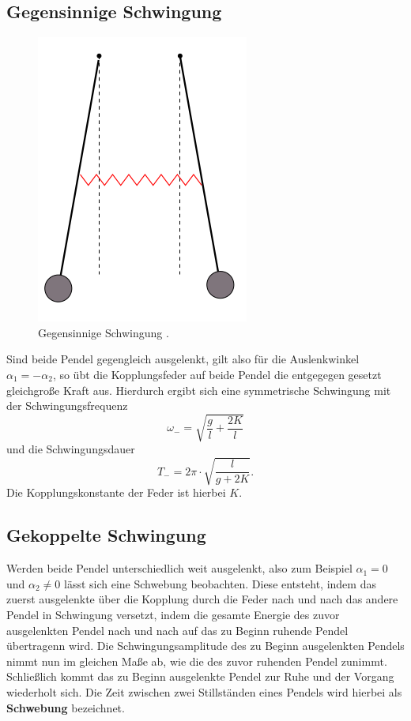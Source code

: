\subsection{Gegensinnige Schwingung}
\FloatBarrier
\begin{figure}
	\centering
	\includegraphics[width=0.4\linewidth]{Bilder/gegenphasig.png}
	\caption{Gegensinnige Schwingung \cite{Anleitung}.}
	\label{fig:gegen}
\end{figure}
\FloatBarrier
Sind beide Pendel gegengleich ausgelenkt, gilt also für die Auslenkwinkel $\alpha_1=-\alpha_2$, so übt die Kopplungsfeder auf beide Pendel die entgegegen gesetzt gleichgroße Kraft aus.
Hierdurch ergibt sich eine symmetrische Schwingung mit der Schwingungsfrequenz
\begin{equation}
	\omega_{\mathrm{-}}=\sqrt{\frac{g}{l}+\frac{2 K}{l}}
\end{equation}
und die Schwingungsdauer
\begin{equation}
	T_{\mathrm{-}}=2\pi\cdot\sqrt{\frac{l}{g+2K}} \text{.}
\end{equation}
Die Kopplungskonstante der Feder ist hierbei $K$.
\subsection{Gekoppelte Schwingung}
Werden beide Pendel unterschiedlich weit ausgelenkt, also zum Beispiel $\alpha_1=0$ und $\alpha_2 \neq 0$ lässt sich eine Schwebung beobachten.
Diese entsteht, indem das zuerst ausgelenkte über die Kopplung durch die Feder nach und nach das andere Pendel in Schwingung versetzt, indem die gesamte Energie des zuvor ausgelenkten Pendel nach und nach auf das zu Beginn ruhende Pendel übertragenn wird.
Die Schwingungsamplitude des zu Beginn ausgelenkten Pendels nimmt nun im gleichen Maße ab, wie die des zuvor ruhenden Pendel zunimmt.
Schließlich kommt das zu Beginn ausgelenkte Pendel zur Ruhe und der Vorgang wiederholt sich.
Die Zeit zwischen zwei Stillständen eines Pendels wird hierbei als \textbf{Schwebung} bezeichnet.
\FloatBarrier

